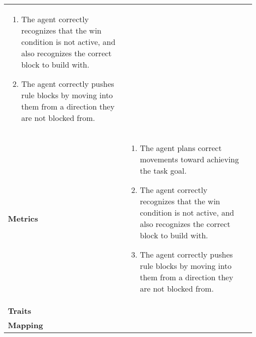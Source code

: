 \documentclass{article}
\begin{document}
\begin{table}[!t]
\begin{tabular}{p{1.5cm}p{4cm}p{4cm}}
\begin{enumerate}[left=0pt]
\item The agent correctly recognizes that the win condition is not active, and also recognizes the correct block to build with.

\item The agent correctly pushes rule blocks by moving into them from a direction they are not blocked from.\end{enumerate} &                \\
			\textbf{Metrics}                                                                                                                                                                                                                                                                                            & \begin{enumerate}[left=0pt]\item The agent plans correct movements toward achieving the task goal.

\item The agent correctly recognizes that the win condition is not active, and also recognizes the correct block to build with.

\item The agent correctly pushes rule blocks by moving into them from a direction they are not blocked from.\end{enumerate} &                \\
			\textbf{Traits}                                                                                                                                                                                                                                                                                             &                                                                                                                                                                                                                                                                                                                                                                  &                \\
			\textbf{Mapping}                                                                                                                                                                                                                                                                                            &                                                                                                                                                                                                                                                                                                                                                                  &                \\
			\bottomrule
		\end{tabular}
		\caption{ }
		\label{tab:babaisai-cogym}
	\end{table}
\end{document}
